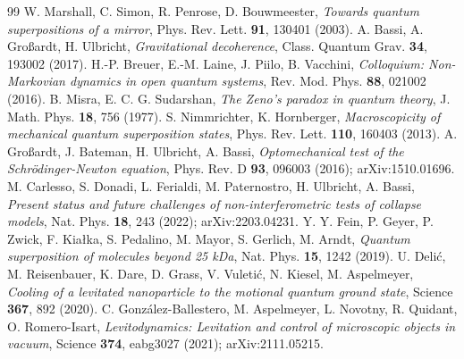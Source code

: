 \documentclass[aps,prd,onecolumn,amsmath,amssymb,nofootinbib,superscriptaddress]{revtex4-2}
\begin{document}
\begin{thebibliography}{99}
 W. Marshall, C. Simon, R. Penrose, D. Bouwmeester, \emph{Towards quantum superpositions of a mirror}, Phys. Rev. Lett. \textbf{91}, 130401 (2003).
 A. Bassi, A. Gro\ss ardt, H. Ulbricht, \emph{Gravitational decoherence}, Class. Quantum Grav. \textbf{34}, 193002 (2017).
 H.-P. Breuer, E.-M. Laine, J. Piilo, B. Vacchini, \emph{Colloquium: Non-Markovian dynamics in open quantum systems}, Rev. Mod. Phys. \textbf{88}, 021002 (2016).
 B. Misra, E. C. G. Sudarshan, \emph{The Zeno's paradox in quantum theory}, J. Math. Phys. \textbf{18}, 756 (1977).
 S. Nimmrichter, K. Hornberger, \emph{Macroscopicity of mechanical quantum superposition states}, Phys. Rev. Lett. \textbf{110}, 160403 (2013).
 A. Gro\ss ardt, J. Bateman, H. Ulbricht, A. Bassi, \emph{Optomechanical test of the Schr\"odinger-Newton equation}, Phys. Rev. D \textbf{93}, 096003 (2016); arXiv:1510.01696.
 M. Carlesso, S. Donadi, L. Ferialdi, M. Paternostro, H. Ulbricht, A. Bassi, \emph{Present status and future challenges of non-interferometric tests of collapse models}, Nat. Phys. \textbf{18}, 243 (2022); arXiv:2203.04231.
 Y. Y. Fein, P. Geyer, P. Zwick, F. Kia{\l}ka, S. Pedalino, M. Mayor, S. Gerlich, M. Arndt, \emph{Quantum superposition of molecules beyond 25 kDa}, Nat. Phys. \textbf{15}, 1242 (2019).
 U. Deli\'c, M. Reisenbauer, K. Dare, D. Grass, V. Vuleti\'c, N. Kiesel, M. Aspelmeyer, \emph{Cooling of a levitated nanoparticle to the motional quantum ground state}, Science \textbf{367}, 892 (2020).
 C. Gonz\'alez-Ballestero, M. Aspelmeyer, L. Novotny, R. Quidant, O. Romero-Isart, \emph{Levitodynamics: Levitation and control of microscopic objects in vacuum}, Science \textbf{374}, eabg3027 (2021); arXiv:2111.05215.

\end{thebibliography}
\end{document}
